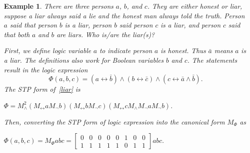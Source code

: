 \documentclass[conference]{IEEEtran}
\newtheorem{ownexample}{Example} 			%
\begin{document}
\begin{ownexample}
There are three persons $a$, $b$, and $c$. They are either honest or liar, suppose a liar always said a lie and the honest man always told the truth.
Person $a$ said that person $b$ is a liar, person $b$ said person $c$ is a liar, and person $c$ said that both $a$ and $b$ are liars. Who is/are the liar(s)?

First, we define logic variable $a$ to indicate person $a$ is honest. 
Thus $\bar a$ means $a$ is a liar. 
The definitions also work for Boolean variables $b$ and $c$.
The statements result in the logic expression
\begin{equation}
\label{liar}
\Phi(a, b, c) = (a \leftrightarrow \bar b) \land (b \leftrightarrow \bar c) \land (c \leftrightarrow \bar a \land \bar b).
\end{equation}
The STP form of~\eqref{liar} is
\begin{center}
  $\Phi = M_{\land}^{2}(M_{\leftrightarrow} a M_\lnot b)(M_{\leftrightarrow} b M_\lnot c)(M_{\leftrightarrow} c M_{\land} M_\lnot a M_\lnot b)$.
\end{center}
Then, converting the STP form of logic expression into the canonical form $M_{\Phi}$ as
\begin{center}
    $\Phi(a, b, c)  = M_{\Phi}abc  = \begin{bmatrix} 0&0&0&0&0&1&0&0 \\ 1&1&1&1&1&0&1&1  \end{bmatrix} abc.$
\end{center}


\end{ownexample}
\end{document}
